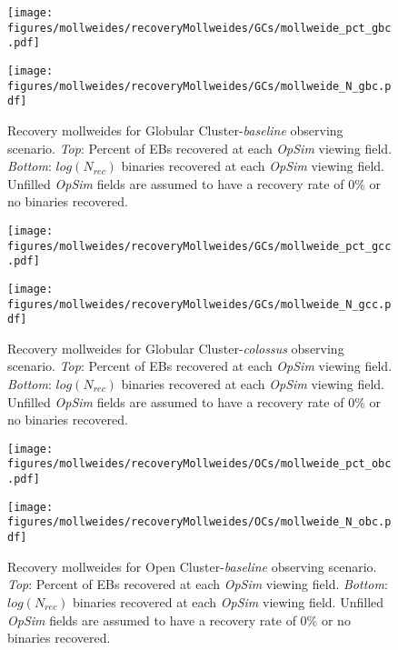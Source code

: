 \documentclass[twocolumn]{aastex63}
\begin{document}
\begin{figure}

    \centering
    \texttt{[image: figures/mollweides/recoveryMollweides/GCs/mollweide\_pct\_gbc.pdf]}

    \texttt{[image: figures/mollweides/recoveryMollweides/GCs/mollweide\_N\_gbc.pdf]}

    \caption{Recovery mollweides for Globular Cluster-\textit{baseline} observing scenario. \textit{Top}: Percent of EBs recovered at each \textit{OpSim} viewing field. \textit{Bottom}: $log(N_{rec})$ binaries recovered at each \textit{OpSim} viewing field. Unfilled \textit{OpSim} fields are assumed to have a recovery rate of 0\% or no binaries recovered.}
    \label{fig:gbc_recovery_mollweides}
    
\end{figure}

\begin{figure}

    \centering
    \texttt{[image: figures/mollweides/recoveryMollweides/GCs/mollweide\_pct\_gcc.pdf]}

    \texttt{[image: figures/mollweides/recoveryMollweides/GCs/mollweide\_N\_gcc.pdf]}

    \caption{Recovery mollweides for Globular Cluster-\textit{colossus} observing scenario. \textit{Top}: Percent of EBs recovered at each \textit{OpSim} viewing field. \textit{Bottom}: $log(N_{rec})$ binaries recovered at each \textit{OpSim} viewing field. Unfilled \textit{OpSim} fields are assumed to have a recovery rate of 0\% or no binaries recovered.}
    \label{fig:gcc_recovery_mollweides}
\end{figure}

\begin{figure}
    \centering
    \texttt{[image: figures/mollweides/recoveryMollweides/OCs/mollweide\_pct\_obc.pdf]}

    \texttt{[image: figures/mollweides/recoveryMollweides/OCs/mollweide\_N\_obc.pdf]}

    \caption{Recovery mollweides for Open Cluster-\textit{baseline} observing scenario. \textit{Top}: Percent of EBs recovered at each \textit{OpSim} viewing field. \textit{Bottom}: $log(N_{rec})$ binaries recovered at each \textit{OpSim} viewing field. Unfilled \textit{OpSim} fields are assumed to have a recovery rate of 0\% or no binaries recovered.}
    \label{fig:obc_recovery_mollweides}
\end{figure}
\end{document}
